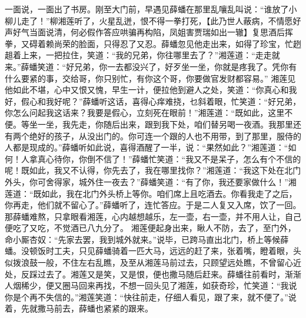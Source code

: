 \documentclass[12pt,oneside]{book}
\begin{document}
一面说，一面出了书房。刚至大门前，早遇见薛蟠在那里乱嚷乱叫说：“谁放了小柳儿走了！”柳湘莲听了，火星乱迸，恨不得一拳打死，【此乃世人蔽病，不情愿好声好气当面说清，何必假作答应哄骗再构陷，凤姐害贾瑞如出一辙】复思酒后挥拳，又碍着赖尚荣的脸面，只得忍了又忍。薛蟠忽见他走出来，如得了珍宝，忙趔趄着上来，一把拉住，笑道：“我的兄弟，你往哪里去了？”湘莲道：“走走就来。”薛蟠笑道：“好兄弟，你一去都没兴了，好歹坐一坐，你就是疼我了。凭你有什么要紧的事，交给哥，你只别忙，有你这个哥，你要做官发财都容易。”
湘莲见他如此不堪，心中又恨又愧，早生一计，便拉他到避人之处，笑道：“你真心和我好，假心和我好呢？”薛蟠听这话，喜得心痒难挠，乜斜着眼，忙笑道：“好兄弟，你怎么问起我这话来？我要是假心，立刻死在眼前！”湘莲道：“既如此，这里不便。等坐一坐，我先走，你随后出来，跟到我下处，咱们替另喝一夜酒。我那里还有两个绝好的孩子，从没出门的。你可连一个跟的人也不用带，到了那里，服侍的人都是现成的。”薛蟠听如此说，喜得酒醒了一半，说：“果然如此？”湘莲道：“如何！人拿真心待你，你倒不信了！”薛蟠忙笑道：“我又不是呆子，怎么有个不信的呢！既如此，我又不认得，你先去了，我在哪里找你？”湘莲道：“我这下处在北门外头，你可舍得家，城外住一夜去？”薛蟠笑道：“有了你，我还要家做什么！”湘莲道：“既如此，我在北门外头桥上等你。咱们席上且吃酒去。你看我走了之后，你再走，他们就不留心了。”薛蟠听了，连忙答应。于是二人复又入席，饮了一回。那薛蟠难熬，只拿眼看湘莲，心内越想越乐，左一壶，右一壶，并不用人让，自己便吃了又吃，不觉酒已八九分了。
湘莲便起身出来，瞅人不防，去了，至门外，命小厮杏奴：“先家去罢，我到城外就来。”说毕，已跨马直出北门，桥上等候薛蟠。没顿饭时工夫，只见薛蟠骑着一匹大马，远远的赶了来，张着嘴，瞪着眼，头似拨浪鼓一般，不住左右乱瞧，及至从湘莲马前过去，只顾望远处瞧，不曾留心近处，反踩过去了。湘莲又是笑，又是恨，便也撒马随后赶来。薛蟠往前看时，渐渐人烟稀少，便又圈马回来再找，不想一回头见了湘莲，如获奇珍，忙笑道：“我说你是个再不失信的。”湘莲笑道：“快往前走，仔细人看见，跟了来，就不便了。”说着，先就撒马前去，薛蟠也紧紧的跟来。
\end{document}
